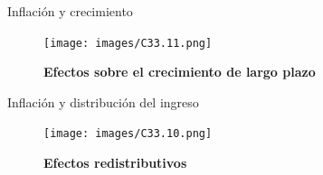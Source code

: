 \documentclass{beamer}
\begin{document}













    


    


\begin{frame}{Inflación y crecimiento}
    \begin{figure} [H]   
\centering\texttt{[image: images/C33.11.png]}\
\caption{\textbf{Efectos sobre el crecimiento de largo plazo}}
\end{figure}
\end{frame}


\begin{frame}{Inflación y distribución del ingreso}
    \begin{figure} [H]   
\centering\texttt{[image: images/C33.10.png]}\
\caption{\textbf{Efectos redistributivos}}
\end{figure}

\end{frame}
\end{document}
